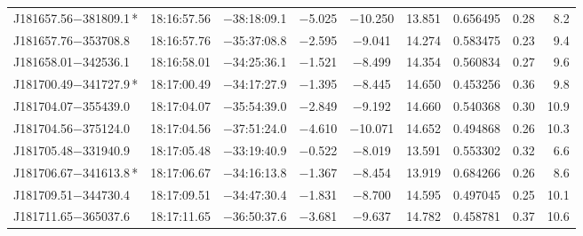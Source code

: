 \begin{table*}
\begin{tabular}{lcccccccr}
J181657.56$-$381809.1\,* & 18:16:57.56 & $-$38:18:09.1 & $-$5.025 & $-$10.250 & 13.851 & 0.656495 & 0.28 & 8.2 \\
J181657.76$-$353708.8 & 18:16:57.76 & $-$35:37:08.8 & $-$2.595 & $-$9.041 & 14.274 & 0.583475 & 0.23 & 9.4 \\
J181658.01$-$342536.1 & 18:16:58.01 & $-$34:25:36.1 & $-$1.521 & $-$8.499 & 14.354 & 0.560834 & 0.27 & 9.6 \\
J181700.49$-$341727.9\,* & 18:17:00.49 & $-$34:17:27.9 & $-$1.395 & $-$8.445 & 14.650 & 0.453256 & 0.36 & 9.8 \\
J181704.07$-$355439.0 & 18:17:04.07 & $-$35:54:39.0 & $-$2.849 & $-$9.192 & 14.660 & 0.540368 & 0.30 & 10.9 \\
J181704.56$-$375124.0 & 18:17:04.56 & $-$37:51:24.0 & $-$4.610 & $-$10.071 & 14.652 & 0.494868 & 0.26 & 10.3 \\
J181705.48$-$331940.9 & 18:17:05.48 & $-$33:19:40.9 & $-$0.522 & $-$8.019 & 13.591 & 0.553302 & 0.32 & 6.6 \\
J181706.67$-$341613.8\,* & 18:17:06.67 & $-$34:16:13.8 & $-$1.367 & $-$8.454 & 13.919 & 0.684266 & 0.26 & 8.6 \\
J181709.51$-$344730.4 & 18:17:09.51 & $-$34:47:30.4 & $-$1.831 & $-$8.700 & 14.595 & 0.497045 & 0.25 & 10.1 \\
J181711.65$-$365037.6 & 18:17:11.65 & $-$36:50:37.6 & $-$3.681 & $-$9.637 & 14.782 & 0.458781 & 0.37 & 10.6 \\
\hline
\end{tabular}
\end{table*}

\addtocounter{table}{-1}

